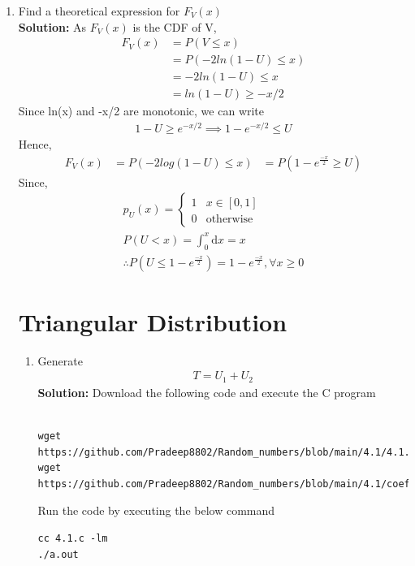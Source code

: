 \documentclass[journal,12pt,twocolumn]{IEEEtran}
\newcommand{\solution}{\noindent \textbf{Solution: }}
\numberwithin{equation}{section}
\renewcommand\thesection{\arabic{section}}
\begin{document}
\begin{enumerate}[label=\thesection.\arabic*,ref=\thesection.\theenumi]
	\item Find a theoretical expression for $F_V(x)$	\\
	\solution 
 As $F_{V}(x)$ is the CDF of V, 
 \begin{align}
 F_{V}(x)&=P(V \leq x)\\
 &=P(-2ln(1-U) \leq x)\\
 &=-2 ln(1-U) \leq x \\
 &=ln(1-U) \geq -x/2
 \end{align}
Since ln(x) and -x/2 are monotonic, we can write
\begin{align}
 1-U \geq e^{-x/2} \nonumber
\implies 1-e^{-x/2} \leq U  \nonumber
\end{align}
 Hence,
 \begin{align}
 F_{V}(x)&=P(-2 log(1-U) \leq x)
&=P(1-e^{\frac{-x}{2}} \geq U)
\end{align}
Since,
\begin{align}
p_{U}(x) = 
		\begin{cases}
			1 & x \in [0, 1] \\
			0 & \text{otherwise}
		\end{cases} \\
 P(U<x)=\int_{0}^{x} \mathrm{d}x=x\\ 
 \therefore P(U \leq 1-e^{\frac{-x}{2}})=1-e^{\frac{-x}{2}}, \forall x\geq 0
 \nonumber
 \end{align}
 
	\section{Triangular Distribution}
	\begin{enumerate}[label=\thesection.\arabic*,ref=\thesection.\theenumi]
	\item Generate 
	\begin{align}
		T = U_1+U_2
	\end{align}
	\solution Download the following code and execute the C program\\	\\
 \begin{lstlisting}
wget https://github.com/Pradeep8802/Random_numbers/blob/main/4.1/4.1.c
wget https://github.com/Pradeep8802/Random_numbers/blob/main/4.1/coeffs.h
	\end{lstlisting}
	Run the code by executing the below command
	\begin{lstlisting}
cc 4.1.c -lm
./a.out
	\end{lstlisting}		
 

\end{enumerate}
\end{enumerate}
\end{document}
